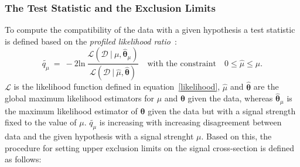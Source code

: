 \subsubsection{The Test Statistic and the Exclusion Limits}
To compute the compatibility of the data with a given hypothesis a test statistic is defined based on the
\emph{profiled likelihood ratio}~\cite{Asympt}: 
\begin{equation}
\tilde{q_{\mu}} ~ = ~ -2 \text{ln} ~ \frac{\mathcal{L}(\mathcal{D}~|~\mu, \hat{\boldsymbol{\theta}}_{\mu})}{\mathcal{L}(\mathcal{D} ~| ~ 
\hat{\mu}, \hat{\boldsymbol{\theta}})}
\quad \text{with the constraint} \quad 0 \leq \hat{\mu} \leq \mu.
\end{equation}
$\mathcal{L}$ is the likelihood function defined in equation~\eqref{likelihood}, $\hat{\mu}$ and $\hat{\boldsymbol{\theta}}$ 
are the global maximum likelihood estimators for $\mu$ and $\boldsymbol{\theta}$ given the data, 
whereas $\hat{\boldsymbol{\theta}}_{\mu}$ is the maximum likelihood estimator of $\boldsymbol{\theta}$ given the data but  with
a signal strength fixed to the value of $\mu$. $\tilde{q_{\mu}}$ is increasing with 
increasing disagreement between data and the given hypothesis with a signal strenght $\mu$.
Based on this, the procedure for setting upper exclusion limits on the signal cross-section
is defined as follows:
